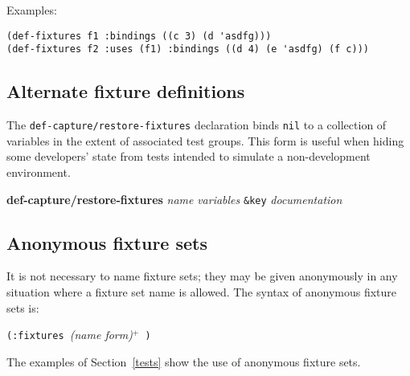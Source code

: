 \documentclass{article}
\begin{document}
Examples:
\begin{verbatim}
(def-fixtures f1 :bindings ((c 3) (d 'asdfg)))
(def-fixtures f2 :uses (f1) :bindings ((d 4) (e 'asdfg) (f c)))
\end{verbatim}

\subsection{Alternate fixture definitions}
The
\texttt{def-capture/restore-fixtures}
declaration binds \texttt{nil} to a collection of variables in the
extent of associated test groups.  This form is useful when hiding
some developers' state from tests intended to simulate a
non-development environment.
\begin{center}
\textbf{def-capture/restore-fixtures}
 \textit{name} \textit{variables}
\texttt{\&key} \textit{documentation}
\end{center}

\subsection{Anonymous fixture sets}
It is not necessary to name fixture sets; they may be given
anonymously in any situation where a fixture set name is allowed.  The
syntax of anonymous fixture sets
is:
\begin{center}
\texttt{(:fixtures }\textit{(name form)}$^+$\texttt{ )}
\end{center}
The examples of Section~\ref{tests} show the use of anonymous fixture
sets.
\end{document}
